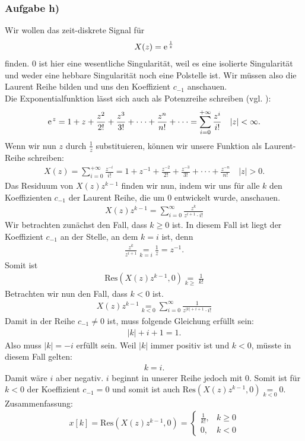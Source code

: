 \documentclass[11pt,a4paper,DIV=12]{scrartcl}
\begin{document}
\subsubsection{Aufgabe h)}
Wir wollen das zeit-diskrete Signal für
\begin{align}
	X(z)=\e^{\frac{1}{z}}
\end{align}
finden. $0$ ist hier eine wesentliche Singularität, weil es eine isolierte Singularität und weder eine hebbare Singularität noch eine Polstelle ist. Wir müssen also die Laurent Reihe bilden und uns den Koeffizient $c_{-1}$ anschauen. \\
Die Exponentialfunktion lässt sich auch als Potenzreihe schreiben (vgl. \cite[Kap. 21, S. 1059]{Bronstein2015}):
\begin{align}
	\e^{z}=1+z+\frac{z^2}{2!}+\frac{z^3}{3!}+\cdot\cdot\cdot+\frac{z^{n}}{n!}+\cdot\cdot\cdot=\sum_{i=0}^{+\infty}\frac{z^i}{i!}\quad |z| < \infty.
\end{align}
Wenn wir nun $z$ durch $\frac{1}{z}$ substituieren, können wir unsere Funktion als Laurent-Reihe schreiben:
\begin{align}
	X(z)=\sum_{i=0}^{+\infty}\frac{z^{-i}}{i!}=1+z^{-1}+\frac{z^{-2}}{2!}+\frac{z^{-3}}{3!}+\cdot\cdot\cdot+\frac{z^{-n}}{n!}\quad|z|>0.
\end{align}
Das Residuum von $X(z)z^{k-1}$ finden wir nun, indem wir uns für alle $k$ den Koeffizienten $c_{-1}$ der Laurent Reihe, die um $0$ entwickelt wurde, anschauen.
\begin{align}
	X(z)z^{k-1}=\sum_{i=0}^{\infty}\frac{z^k}{z^{i+1}\cdot i!}
\end{align}
Wir betrachten zunächst den Fall, dass $k\geq0$ ist. In diesem Fall ist liegt der Koeffizient $c_{-1}$ an der Stelle, an dem $k=i$ ist, denn
\begin{align}
	\frac{z^k}{z^{i+1}}\underset{k=i}{=}\frac{1}{z}=z^{-1}.
\end{align}
Somit ist
\begin{align}
	\mathrm{Res}(X(z)z^{k-1},0)\underset{k\geq}{=}\frac{1}{k!}
\end{align}
Betrachten wir nun den Fall, dass $k<0$ ist.
\begin{align}
	X(z)z^{k-1}\underset{k<0}{=}\sum_{i=0}^{\infty}\frac{1}{z^{|k|+i+1}\cdot i!}
\end{align}
Damit in der Reihe $c_{-1}\neq 0$ ist, muss folgende Gleichung erfüllt sein:
\begin{align}
	|k|+i+1 = 1.
\end{align}
Also muss $|k| = -i$ erfüllt sein. Weil $|k|$ immer positiv ist und $k<0$, müsste in diesem Fall gelten:
\begin{align}
	k = i.
\end{align}
Damit wäre $i$ aber negativ. $i$ beginnt in unserer Reihe jedoch mit $0$. Somit ist für $k<0$ der Koeffizient $c_{-1}=0$ und somit ist auch $\mathrm{Res}(X(z)z^{k-1},0)\underset{k<0}{=}0$.
Zusammenfassung:
\begin{align}
	x[k]=\mathrm{Res}(X(z)z^{k-1},0)=\begin{cases}
		\frac{1}{k!}, &k\geq0 \\
		0, &k<0
	\end{cases}
\end{align}
\newpage
\end{document}
